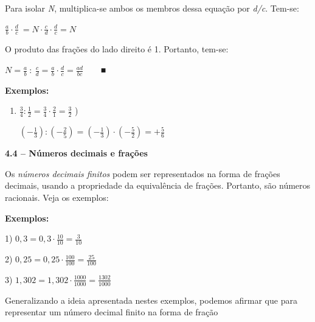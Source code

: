 \documentclass[12pt]{article}
\renewcommand{\_}{\kern-1.5pt\textunderscore\kern-1.5pt}
\begin{document}
Para isolar \textit{N}, multiplica-se ambos os membros dessa equação por \textit{d/c}. Tem-se:\par

\tab  \( \frac{a}{b} \cdot  \frac{d}{c}~ =N  \cdot  \frac{c}{d} \cdot  \frac{d}{c}=N \) \par


\vspace{\baselineskip}
O produto das frações do lado direito é 1. Portanto, tem-se:\par

\tab  \( N=\frac{a}{b}~:~\frac{c}{d}= \frac{a}{b} \cdot  \frac{d}{c} =\frac{ad}{bc}~ \) \ \ \  ■\tab \par

\setlength{\parskip}{0.0pt}
\textbf{Exemplos:}\par

\begin{enumerate}
	\item  \( \frac{3}{4}:\frac{1}{2}=\frac{3}{4} \cdot \frac{2}{1}=\frac{3}{2} \) \tab {}){\fontsize{16pt}{19.2pt}\selectfont   \(  \left( -\frac{1}{3} \right) : \left( -\frac{2}{5} \right) = \left( -\frac{1}{3} \right)  \cdot  \left( -\frac{5}{2} \right) =+\frac{5}{6} \) \par}
\end{enumerate}\par


\vspace{\baselineskip}
\textbf{4.4 – Números decimais e frações }\par

Os \textit{números decimais finitos} podem ser representados na forma de frações decimais, usando a propriedade da equivalência de frações. Portanto, são números racionais. Veja os exemplos:\par

\textbf{Exemplos:}\par

1)  \( 0,3=0,3 \cdot \frac{10}{10}=\frac{3}{10}~~ \) \tab \tab \tab \tab \par

2)  \( 0,25=0,25 \cdot \frac{100}{100}=\frac{25}{100}~~ \)  \tab \tab \tab \tab \par

3)  \( 1,302=1,302 \cdot \frac{1000}{1000}=\frac{1302}{1000}~~ \) \ \ \ \  \par


\vspace{\baselineskip}
\begin{justify}
Generalizando a ideia apresentada nestes exemplos, podemos afirmar que para representar um número decimal finito na forma de fração
\end{justify}\par
\end{document}
